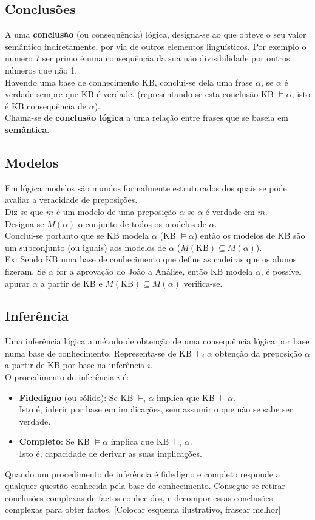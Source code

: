 \documentclass[]{report}
\begin{document}
\subsection{Conclusões}
A uma \textbf{conclusão} (ou consequência) lógica, designa-se ao que obteve o seu valor semântico indiretamente, por via de outros elementos linguísticos. Por exemplo o numero 7 ser primo é uma consequência da sua não divisibilidade por outros números que não 1.\\[0.2cm]
Havendo uma base de conhecimento KB, conclui-se dela uma frase $\alpha$, se $\alpha$ é verdade sempre que KB é verdade. (representando-se esta conclusão $\text{KB }\models \alpha$, isto é KB consequência de $\alpha$).\\[0.2cm]
Chama-se de \textbf{conclusão lógica} a uma relação entre frases que se baseia em \textbf{semântica}.
\subsection{Modelos}
Em lógica modelos são mundos formalmente estruturados dos quais se pode avaliar a veracidade de preposições.\\
Diz-se que $m$ é um modelo de uma preposição $\alpha$ se $\alpha$ é verdade em $m$.\\
Designa-se $M(\alpha)$ o conjunto de todos os modelos de $\alpha$.\\
Conclui-se portanto que se KB modela $\alpha$ ($\text{KB } \models \alpha$) então os modelos de KB são um subconjunto (ou iguais) aos modelos de $\alpha$ ($M(\text{KB}) \subseteq M(\alpha)$).\\
Ex: Sendo KB uma base de conhecimento que define as cadeiras que os alunos fizeram. Se $\alpha$ for a aprovação do João a Análise, então KB modela $\alpha$, é possível apurar $\alpha$ a partir de KB e $M(\text{KB}) \subseteq M(\alpha)$ verifica-se.
\subsection{Inferência}
Uma inferência lógica a método de obtenção de uma consequência lógica por base numa base de conhecimento. Representa-se de KB $\vdash_i \alpha$ obtenção da preposição $\alpha$ a partir de KB por base na inferência $i$.\\[0.2cm]
O procedimento de inferência $i$ é:
\begin{itemize}
\item \textbf{Fidedigno} (ou sólido): Se KB $\vdash_i \alpha$ implica que KB $\models \alpha$.\\
Isto é, inferir por base em implicações, sem assumir o que não se sabe ser verdade.
\item \textbf{Completo}: Se KB $\models \alpha$ implica que KB $\vdash_i \alpha$.\\
Isto é, capacidade de derivar as suas implicações.
\end{itemize}
Quando um procedimento de inferência é fidedigno e completo responde a qualquer questão conhecida pela base de conhecimento. Consegue-se retirar conclusões complexas de factos conhecidos, e decompor essas conclusões complexas para obter factos.
[Colocar esquema ilustrativo, frasear melhor]
\end{document}
